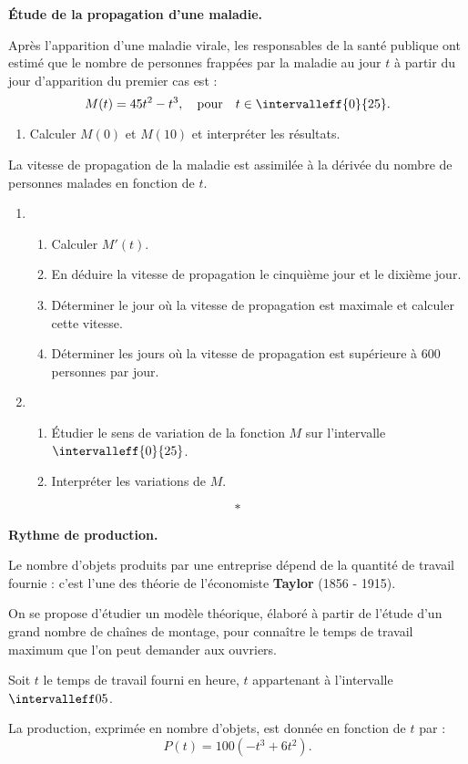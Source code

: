 \documentclass[11pt,openright,twoside,french]{book}
\begin{document}
\bigskip

\exo \textbf{\'Etude de la propagation d'une maladie.}\par\medskip
Après l'apparition d'une maladie virale, les responsables de la santé publique ont estimé que le nombre de personnes frappées par la maladie au jour $t$ à partir du jour d'apparition du premier cas est :
\[M(t) = 45t^2 - t^3, \quad \text{pour}\quad t \in \intervalleff{0}{25}.\]

\begin{enumerate}
    \item Calculer $M(0)$ et $M(10)$ et interpréter les résultats.
\end{enumerate}

La vitesse de propagation de la maladie est assimilée à la dérivée du nombre de personnes malades en fonction de $t$.

\begin{enumerate}[resume]
    \item \begin{enumerate}
                    \item Calculer $M'(t)$.
                    \item En déduire la vitesse de propagation le cinquième jour et le dixième jour.
                    \item Déterminer le jour où la vitesse de propagation est maximale et calculer cette vitesse.
                    \item Déterminer les jours où la vitesse de propagation est supérieure à $600$ personnes par jour.
            \end{enumerate}
    \item \begin{enumerate}
                    \item \'Etudier le sens de variation de la fonction $M$ sur l'intervalle $\intervalleff{0}{25}$.
                    \item Interpréter les variations de $M$.
            \end{enumerate}
\end{enumerate}\[*\]

\exo \textbf{Rythme de production.}\par\medskip
Le nombre d'objets produits par une entreprise dépend de la quantité de travail fournie : c'est l'une des théorie de l'économiste \textbf{Taylor} (1856 - 1915).\par
On se propose d'étudier un modèle théorique, élaboré à partir de l'étude d'un grand nombre de chaînes de montage, pour connaître le temps de travail maximum que l'on peut demander aux ouvriers.\par
Soit $t$ le temps de travail fourni en heure, $t$ appartenant à l'intervalle $\intervalleff 0 5$.\par
La production, exprimée en nombre d'objets, est donnée en fonction de $t$ par :
\[P(t) = 100(-t^3 + 6t^2).\]
\end{document}
